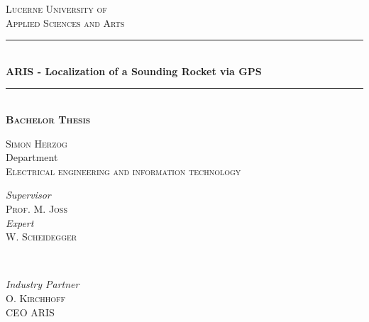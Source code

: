
\begin{titlepage} %
	\newcommand{\HRule}{\rule{\linewidth}{0.5mm}} %
	
	\center %
	
	\textsc{\large Lucerne University of\\ Applied Sciences and Arts}\\[0.2cm] %
	
	
	\HRule\\[0.4cm]
	
	{\LARGE\bfseries ARIS - Localization of a Sounding Rocket via GPS}\\[0.4cm] %
	
	\HRule\\[0.5cm]
	
	\large \textsc{\textbf{Bachelor Thesis}}\\[0.5cm] 
	
	\vfill
	
	\textsc{\normalsize Simon Herzog}\\[0.3cm]
	
	{\normalsize Department}\\
	
	\textsc{\normalsize Electrical engineering and information technology}\\[0.3cm] %
	
	\vfill
	
	
	\begin{minipage}{0.4\textwidth}
		\begin{flushleft}
			\normalsize
			\textit{Supervisor}\\
			\textsc{Prof.} M. \textsc{Joss} %
			\vspace{4mm}\\
			\normalsize
			\textit{Expert}\\
			W. \textsc{Scheidegger} %
		\end{flushleft}
	\end{minipage}
	~
	\begin{minipage}{0.4\textwidth}
		\begin{flushright}
			\normalsize
			\textit{Industry Partner}\\
			O. \textsc{Kirchhoff}\\
			CEO ARIS
		\end{flushright}
	\end{minipage}
	

\end{titlepage}

